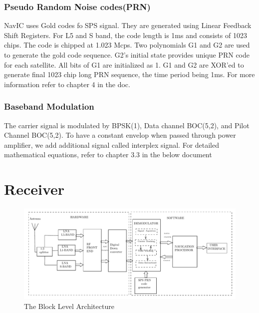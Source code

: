 \documentclass[11pt]{book}
\begin{document}
\subsection{Pseudo Random Noise codes(PRN)}
NavIC uses Gold codes fo SPS signal. They are generated using Linear Feedback Shift Registers. For L5 and S band, the code length is 1ms and consists of 1023 chips. The code is chipped at 1.023 Mcps. Two polynomials G1 and G2 are used to generate the gold code sequence. G2's initial state provides unique PRN code for each satellite. All bits of G1 are initialized as 1. G1 and G2 are XOR'ed to generate final 1023 chip long PRN sequence, the time period being 1ms. For more information refer to chapter 4 in the doc.
\subsection{Baseband Modulation}
The carrier signal is modulated by BPSK(1), Data channel BOC(5,2), and Pilot Channel BOC(5,2). To have a constant envelop when passed through power amplifier, we add additional signal called interplex signal.
For detailed mathematical equations, refer to chapter 3.3 in the below document
%



\chapter{Receiver}
\begin{figure}
\includegraphics[scale=0.5]{figs/block1}
\caption{The Block Level Architecture}
\label{fig:Block-diagram}
\end{figure}
\end{document}
